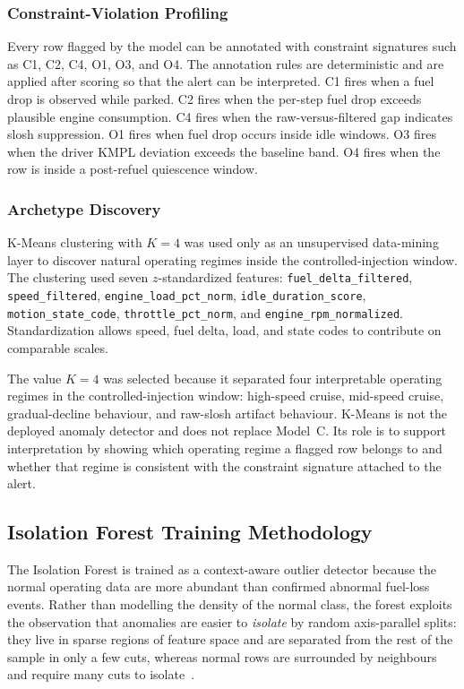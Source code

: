 \subsubsection{Constraint-Violation Profiling}

Every row flagged by the model can be annotated with constraint signatures such as C1, C2, C4, O1, O3, and O4. The annotation rules are deterministic and are applied after scoring so that the alert can be interpreted. C1 fires when a fuel drop is observed while parked. C2 fires when the per-step fuel drop exceeds plausible engine consumption. C4 fires when the raw-versus-filtered gap indicates slosh suppression. O1 fires when fuel drop occurs inside idle windows. O3 fires when the driver KMPL deviation exceeds the baseline band. O4 fires when the row is inside a post-refuel quiescence window.

\subsubsection{Archetype Discovery}

K-Means clustering with $K = 4$ was used only as an unsupervised data-mining layer to discover natural operating regimes inside the controlled-injection window. The clustering used seven $z$-standardized features: \texttt{fuel\_delta\_\allowbreak filtered}, \texttt{speed\_\allowbreak filtered}, \texttt{engine\_load\_pct\_\allowbreak norm}, \texttt{idle\_duration\_\allowbreak score}, \texttt{motion\_state\_\allowbreak code}, \texttt{throttle\_pct\_\allowbreak norm}, and \texttt{engine\_rpm\_\allowbreak normalized}. Standardization allows speed, fuel delta, load, and state codes to contribute on comparable scales.

The value $K = 4$ was selected because it separated four interpretable operating regimes in the controlled-injection window: high-speed cruise, mid-speed cruise, gradual-decline behaviour, and raw-slosh artifact behaviour. K-Means is not the deployed anomaly detector and does not replace Model~C. Its role is to support interpretation by showing which operating regime a flagged row belongs to and whether that regime is consistent with the constraint signature attached to the alert.

\subsection{Isolation Forest Training Methodology}
\label{sec:if_math}

The Isolation Forest is trained as a context-aware outlier detector because the normal operating data are more abundant than confirmed abnormal fuel-loss events. Rather than modelling the density of the normal class, the forest exploits the observation that anomalies are easier to \emph{isolate} by random axis-parallel splits: they live in sparse regions of feature space and are separated from the rest of the sample in only a few cuts, whereas normal rows are surrounded by neighbours and require many cuts to isolate~\cite{liu2008isolation_forest}.

